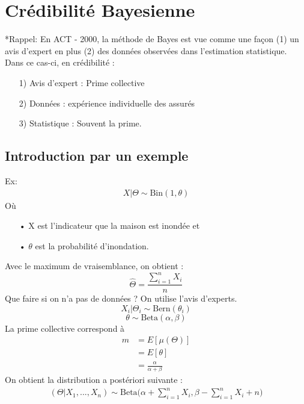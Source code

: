 
\chapter{Crédibilité Bayesienne}
\label{chp:bayesienne}
*Rappel: En ACT - 2000, la méthode de Bayes est vue comme une façon (1) un avis d'expert en plus (2) des données observées dans l'estimation statistique. Dans ce cas-ci, en crédibilité :
\begin{itemize}
\item[1)] Avis d'expert : Prime collective
\item[2)] Données : expérience individuelle des assurés
\item[3)] Statistique : Souvent la prime. 
\end{itemize}

\section{Introduction par un exemple}
Ex:
\begin{align*}
X|\Theta \sim \text{Bin}(1, \theta)
\end{align*}
Où
\begin{itemize}
\item[• X] est l'indicateur que la maison est inondée et 
\item[• $\theta$] est la probabilité d'inondation.
\end{itemize}
Avec le maximum de vraisemblance, on obtient :
\begin{equation}
\label{sec:eq:maxim}
\widehat{\Theta} = \frac{\sum_{i =1}^{n} X_i}{n}
\end{equation}
Que faire si on n'a pas de données ? On utilise l'avis d'experts.
\begin{equation}
X_i|\Theta_i \sim \text{Bern}(\theta_i)
\end{equation}
\begin{equation}
\label{sec:equa:a prio}
\theta \sim \text{Beta}(\alpha, \beta)
\end{equation}
La prime collective correspond à 
\begin{align*}
m &= E[\mu(\Theta)] \\
&= E[\theta]\\
&= \frac{\alpha}{\alpha + \beta}
\end{align*}
On obtient la distribution a postériori suivante :
\begin{align*}
(\Theta | X_1, ..., X_n) \sim \text{Beta}\Bigg(\alpha + \sum_{i =1}^{n} X_i, \beta - \sum_{i =1}^{n} X_i + n\Bigg)
\end{align*}
